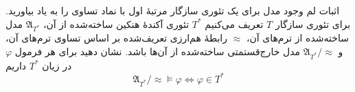 اثبات لم وجود مدل برای یک تئوری سازگار مرتبهٔ اول با نماد تساوی را به یاد بیاورید. برای تئوری سازگار $T$ تعریف می‌کنیم $T^*$ تئوری آکندهٔ هنکین ساخته‌شده از آن، $\mathfrak{A}_{T^*}$ مدل ساخته‌شده از ترم‌های آن، $\approx$ رابطهٔ هم‌ارزی تعریف‌شده بر اساس تساوی ترم‌های آن، و ${\mathfrak{A}_{T^*}}/{\approx}$ مدل خارج‌قستمتی ساخته‌شده از آن‌ها باشد. نشان دهید برای هر فرمول $\varphi$ در زیان $T^*$ داریم
\[ {\mathfrak{A}_{T^*}}/{\approx} \models \varphi \iff \varphi \in T^* \]